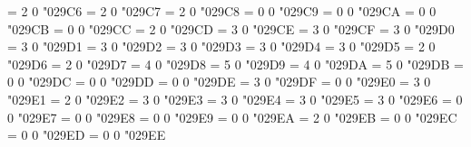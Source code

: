 \Umathchardef\boxast = 2 0 "029C6 %
\Umathchardef\boxcircle = 2 0 "029C7 %
\Umathchardef\boxbox = 2 0 "029C8 %
\Umathchardef\boxonbox = 0 0 "029C9 %
\Umathchardef\triangleodot = 0 0 "029CA %
\Umathchardef\triangleubar = 0 0 "029CB %
\Umathchardef\triangles = 0 0 "029CC %
\Umathchardef\triangleserifs = 2 0 "029CD %
\Umathchardef\rtriltri = 3 0 "029CE %
\Umathchardef\ltrivb = 3 0 "029CF %
\Umathchardef\vbrtri = 3 0 "029D0 %
\Umathchardef\lfbowtie = 3 0 "029D1 %
\Umathchardef\rfbowtie = 3 0 "029D2 %
\Umathchardef\fbowtie = 3 0 "029D3 %
\Umathchardef\lftimes = 3 0 "029D4 %
\Umathchardef\rftimes = 3 0 "029D5 %
\Umathchardef\hourglass = 2 0 "029D6 %
\Umathchardef\blackhourglass = 2 0 "029D7 %
\Umathchardef\lvzigzag = 4 0 "029D8 %
\Umathchardef\rvzigzag = 5 0 "029D9 %
\Umathchardef\Lvzigzag = 4 0 "029DA %
\Umathchardef\Rvzigzag = 5 0 "029DB %
\Umathchardef\iinfin = 0 0 "029DC %
\Umathchardef\tieinfty = 0 0 "029DD %
\Umathchardef\nvinfty = 0 0 "029DE %
\Umathchardef\dualmap = 3 0 "029DF %
\Umathchardef\laplac = 0 0 "029E0 %
\Umathchardef\lrtriangleeq = 3 0 "029E1 %
\Umathchardef\shuffle = 2 0 "029E2 %
\Umathchardef\eparsl = 3 0 "029E3 %
\Umathchardef\smeparsl = 3 0 "029E4 %
\Umathchardef\eqvparsl = 3 0 "029E5 %
\Umathchardef\gleichstark = 3 0 "029E6 %
\Umathchardef\thermod = 0 0 "029E7 %
\Umathchardef\downtriangleleftblack = 0 0 "029E8 %
\Umathchardef\downtrianglerightblack = 0 0 "029E9 %
\Umathchardef\blackdiamonddownarrow = 0 0 "029EA %
\Umathchardef\mdlgblklozenge = 2 0 "029EB %
\Umathchardef\circledownarrow = 0 0 "029EC %
\Umathchardef\blackcircledownarrow = 0 0 "029ED %
\Umathchardef\errbarsquare = 0 0 "029EE %
